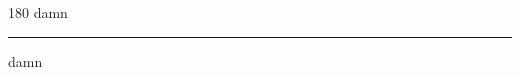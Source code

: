 
\begin{frame}
\begin{center}
\begin{turn}{180}
{\fontsize{2.5cm}{1em}\selectfont damn}
\end{turn}
\vspace{1em}\par  
\hrule
\vspace{1em}\par  
{\fontsize{2.5cm}{1em}\selectfont damn}
\end{center}
\end{frame}
